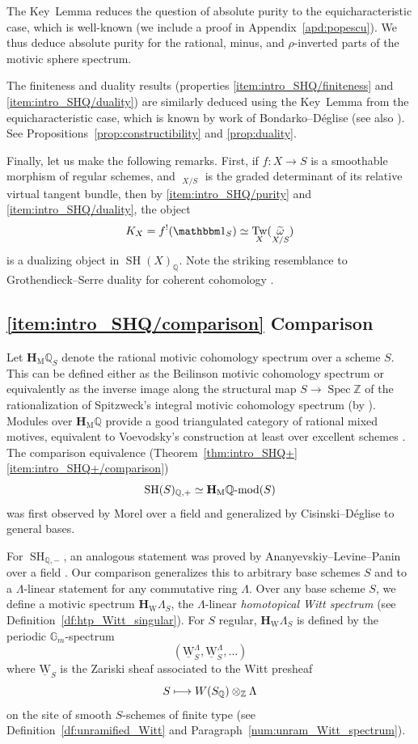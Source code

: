 \documentclass[JEP,XML,SOM,Unicode]{cedram}
\def\mto{\mathchoice{\longmapsto}{\mapsto}{\mapsto}{\mapsto}}
\newcommand{\modl}[1]{#1\textnormal{-}\mathrm{mod}}
\newcommand{\un}{\mathbbm 1}
\newcommand{\uW}{\underline{\mathrm W}}
\newcommand{\HM}{\mathbf H_{\mathrm{M}}}
\newcommand{\HW}{\mathbf H_{\mathrm{W}}}
\DeclareMathOperator{\SH}{SH}
\DeclareMathOperator{\spec}{Spec}
\DeclareMathOperator{\Tw}{Tw}
\DeclareMathOperator{\tomega}{\widetilde \omega}
\newcommand{\ZZ} {\mathbb Z}
\newcommand{\QQ} {\mathbb Q}
\newcommand{\GG} {\mathbb{G}_m}
\theoremstyle{remark}
\theoremstyle{definition}
\numberwithin{equation}{thm}
\begin{document}
The Key~Lemma reduces the question of absolute purity to the equicharacteristic case, which is well-known (we include a proof in Appendix~\ref{apd:popescu}).
We thus deduce absolute purity for the rational, minus, and $\rho$-inverted parts of the motivic sphere spectrum.

The finiteness and duality results (properties \eqref{item:intro_SHQ/finiteness} and \eqref{item:intro_SHQ/duality}) are similarly deduced using the Key~Lemma from the equicharacteristic case, which is known by work of Bondarko--Déglise \cite{BD1} (see also \cite[\S3.1]{ElmantoKhan}).
See Propositions~\ref{prop:constructibility} and \ref{prop:duality}.

Finally, let us make the following remarks.
First, if $f : X \to S$ is a smoothable morphism of regular schemes, and $\tomega_{X/S}$ is the graded determinant of its relative virtual tangent bundle, then by \eqref{item:intro_SHQ/purity} and \eqref{item:intro_SHQ/duality}, the object
\[
K_X = f^!(\un_S) \simeq \Tw_X(\tomega_{X/S})
\]
is a dualizing object in $\SH(X)_\QQ$.
Note the striking resemblance to Grothendieck--Serre duality for coherent cohomology \cite[Def.\,III.2, Prop.\,7.2]{HartshorneRD}.

\subsection*{\eqref{item:intro_SHQ/comparison} Comparison}

Let $\HM\QQ_S$ denote the rational motivic cohomology spectrum over a scheme $S$.
This can be defined either as the Beilinson motivic cohomology spectrum \cite[Def.\,14.1.2]{CD3} or equivalently as the inverse image along the structural map $S \to \spec{\ZZ}$ of the rationalization of Spitzweck's integral motivic cohomology spectrum (by \cite[Th.\,7.14]{SpitzweckSpectrum}).
Modules over $\HM\QQ$ provide a good triangulated category of rational mixed motives, equivalent to Voevodsky's construction at least over excellent schemes \cite[\S16.1]{CD3}.
The comparison equivalence (Theorem~\ref{thm:intro_SHQ+}\eqref{item:intro_SHQ+/comparison})
\[
\SH(S)_{\QQ,+} \simeq \modl{\HM\QQ}(S)
\]
was first observed by Morel over a field \cite{MorelSplitting} and generalized by Cisinski--Déglise \cite[\S 16.2]{CD3} to general bases.

For $\SH_{\QQ,-}$, an analogous statement was proved by Ananyevskiy--Levine--Panin over a field \cite[\S 4]{ALP}.
Our comparison generalizes this to arbitrary base schemes $S$ and to a $\Lambda$-linear statement for any commutative ring $\Lambda$.
Over any base scheme $S$, we define a motivic spectrum $\HW \Lambda_S$, the $\Lambda$-linear \emph{homotopical Witt spectrum} (see Definition~\ref{df:htp_Witt_singular}).
For $S$ regular, $\HW \Lambda_S$ is defined by the periodic $\GG$-spectrum
\[
(\uW_S^\Lambda,\uW_S^\Lambda,\hdots)
\]
where $\uW_S$ is the Zariski sheaf associated to the Witt presheaf
\[
S \mto W(S_\QQ) \otimes_\ZZ \Lambda
\]
on the site of smooth $S$-schemes of finite type (see Definition~\ref{df:unramified_Witt} and Paragraph~\ref{num:unram_Witt_spectrum}).
\end{document}
